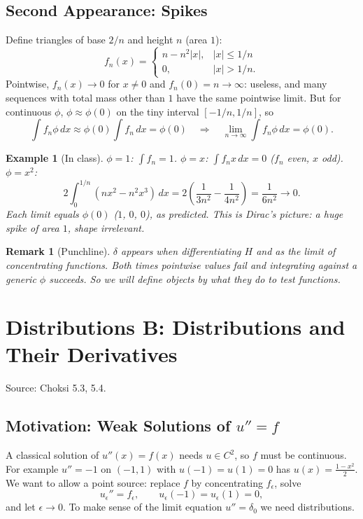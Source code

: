 \documentclass{article}
\newtheorem*{example}{Example}
\newtheorem{remark}{Remark}
\begin{document}
\subsection{Second Appearance: Spikes}
Define triangles of base $2/n$ and height $n$ (area $1$):
\begin{equation}
    f_n(x) = \begin{cases} n - n^2|x|, & |x| \leq 1/n \\ 0, & |x| > 1/n. \end{cases}
\end{equation}
Pointwise, $f_n(x) \to 0$ for $x \neq 0$ and $f_n(0) = n \to \infty$: useless, and many sequences with total mass other than $1$ have the same pointwise limit. But for continuous $\phi$, $\phi \approx \phi(0)$ on the tiny interval $[-1/n, 1/n]$, so
\begin{equation}
    \int f_n \phi\,dx \approx \phi(0)\int f_n\,dx = \phi(0) \quad \Longrightarrow \quad \lim_{n\to\infty}\int f_n\phi\,dx = \phi(0).
\end{equation}
\begin{example}[In class]
    $\phi = 1$: $\int f_n = 1$. $\phi = x$: $\int f_n x\,dx = 0$ ($f_n$ even, $x$ odd). $\phi = x^2$:
    \begin{equation}
        2\int_0^{1/n}(n x^2 - n^2 x^3)\,dx = 2\left(\frac{1}{3n^2} - \frac{1}{4n^2}\right) = \frac{1}{6n^2} \to 0.
    \end{equation}
    Each limit equals $\phi(0)$ ($1$, $0$, $0$), as predicted. This is Dirac's picture: a huge spike of area $1$, shape irrelevant.
\end{example}
\begin{remark}[Punchline]
    $\delta$ appears when differentiating $H$ and as the limit of concentrating functions. Both times pointwise values fail and integrating against a generic $\phi$ succeeds. So we will \emph{define} objects by what they do to test functions.
\end{remark}


\section{Distributions B: Distributions and Their Derivatives}\label{sec:distB}
Source: Choksi 5.3, 5.4.

\subsection{Motivation: Weak Solutions of $u'' = f$}
A classical solution of $u''(x) = f(x)$ needs $u \in C^2$, so $f$ must be continuous. For example $u'' = -1$ on $(-1,1)$ with $u(-1) = u(1) = 0$ has $u(x) = \frac{1-x^2}{2}$. We want to allow a point source: replace $f$ by concentrating $f_\epsilon$, solve
\begin{equation}
    u_\epsilon'' = f_\epsilon, \qquad u_\epsilon(-1) = u_\epsilon(1) = 0,
\end{equation}
and let $\epsilon \to 0$. To make sense of the limit equation $u'' = \delta_0$ we need distributions.
\end{document}
